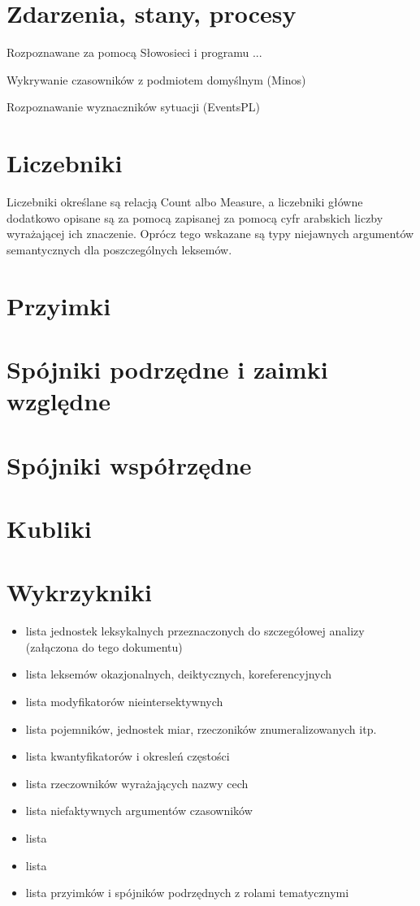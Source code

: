 \documentclass[a4paper,12pt]{article}
\begin{document}
\section{Zdarzenia, stany, procesy}
Rozpoznawane za pomocą Słowosieci i programu ...

Wykrywanie czasowników z podmiotem domyślnym (Minos)

Rozpoznawanie wyznaczników sytuacji (EventsPL)

\section{Liczebniki}
Liczebniki określane są relacją Count albo Measure, a liczebniki główne dodatkowo opisane są za pomocą 
zapisanej za pomocą cyfr arabskich liczby wyrażającej ich znaczenie.
Oprócz tego wskazane są typy niejawnych argumentów semantycznych dla poszczególnych leksemów.

\section{Przyimki}

\section{Spójniki podrzędne i zaimki względne}

\section{Spójniki współrzędne}

\section{Kubliki}

\section{Wykrzykniki}

\begin{itemize}
\item lista jednostek leksykalnych przeznaczonych do szczegółowej analizy (załączona do tego dokumentu)
\item lista leksemów okazjonalnych, deiktycznych, koreferencyjnych
\item lista modyfikatorów nieintersektywnych
\item lista pojemników, jednostek miar, rzeczoników znumeralizowanych itp.
\item lista kwantyfikatorów i okresleń częstości
\item lista rzeczowników wyrażających nazwy cech
\item lista niefaktywnych argumentów czasowników
\item lista 
\item lista 
\item lista przyimków i spójników podrzędnych z rolami tematycznymi


\end{itemize}
\end{document}
